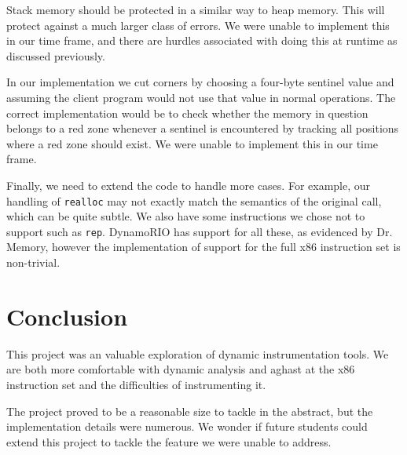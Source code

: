 \documentclass{article}
\newcommand{\code}[1]{\texttt{#1}}
\begin{document}
Stack memory should be protected in a similar way to heap memory.  This will protect against a much larger class of errors.  We were unable to implement this in our time frame, and there are hurdles associated with doing this at runtime as discussed previously.

In our implementation we cut corners by choosing a four-byte sentinel value and assuming the client program would not use that value in normal operations.  The correct implementation would be to check whether the memory in question belongs to a red zone whenever a sentinel is encountered by tracking all positions where a red zone should exist.  We were unable to implement this in our time frame.

Finally, we need to extend the code to handle more cases.  For example, our handling of \code{realloc} may not exactly match the semantics of the original call, which can be quite subtle.  We also have some instructions we chose not to support such as \code{rep}.  DynamoRIO has support for all these, as evidenced by Dr. Memory, however the implementation of support for the full x86 instruction set is non-trivial.


\section{Conclusion} %
\label{sec:Conclusion}

This project was an valuable exploration of dynamic instrumentation tools.  We are both more comfortable with dynamic analysis and aghast at the x86 instruction set and the difficulties of instrumenting it.

The project proved to be a reasonable size to tackle in the abstract, but the implementation details were numerous.  We wonder if future students could extend this project to tackle the feature we were unable to address.




\end{document}
